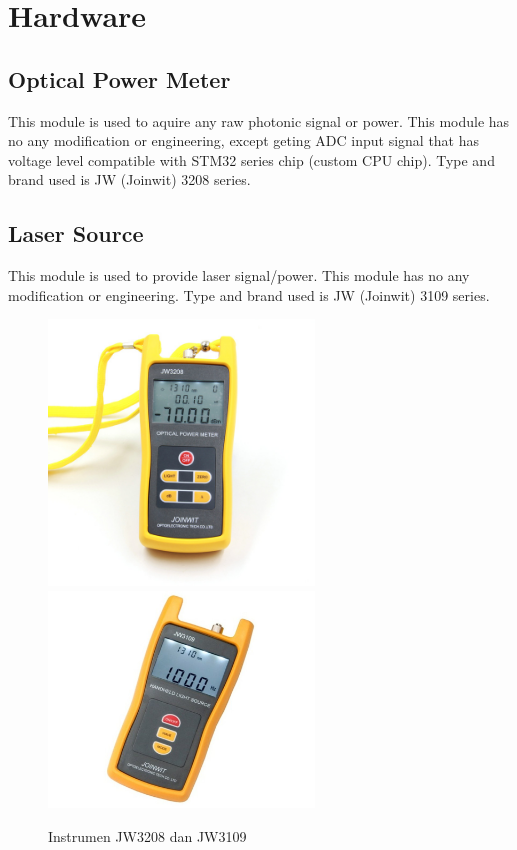 \documentclass[12pt,]{book}
\begin{document}
	\section{Hardware}
	
	\subsection{Optical Power Meter}
	This module is used to aquire any raw photonic signal or power.
	This module has no any modification or engineering, except geting ADC input signal that has voltage level compatible with STM32 series chip (custom CPU chip).
	Type and brand used is JW (Joinwit) 3208 series.
	
	\subsection{Laser Source}
	This module is used to provide laser signal/power. 
	This module has no any modification or engineering.
	Type and brand used is JW (Joinwit) 3109 series.
	
	\begin{figure}[h]
		\centering
		\includegraphics[width=200pt]{images/jw3208}
		\includegraphics[width=200pt]{images/jw3109}
		\caption{Instrumen JW3208 dan JW3109}
	\end{figure}
	
\end{document}

